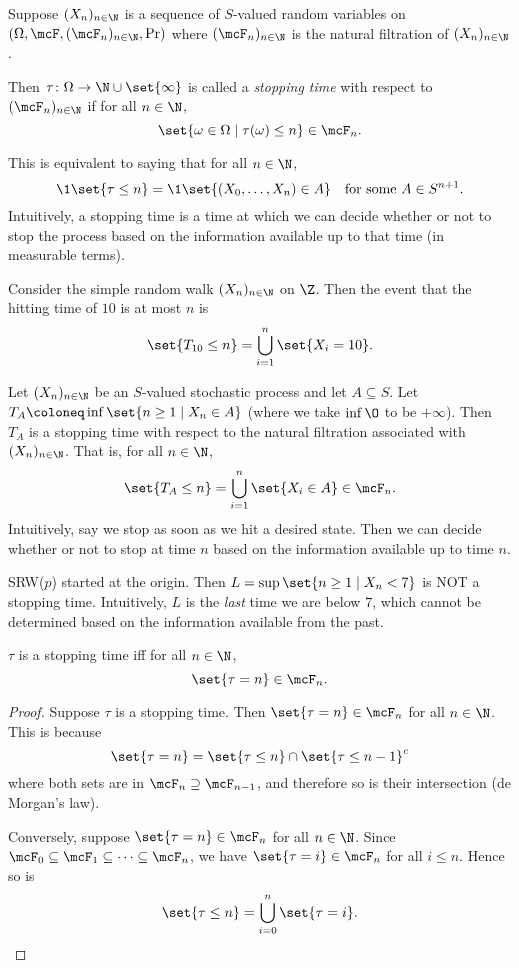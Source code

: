 \begin{definition} \label{def:stopping_time}
    Suppose $(X_n)_{n \in \N}$ is a sequence of $S$-valued random variables
    on $(\Omega, \F, (\F_n)_{n \in \N}, \Pr)$ where $(\F_n)_{n \in \N}$ is
    the natural filtration of $(X_n)_{n \in \N}$.

    Then $\tau\colon \Omega \to \N \cup \set{\infty}$ is called a
    \emph{stopping time} with respect to $(\F_n)_{n \in \N}$ if for all
    $n \in \N$, \[
        \set{\omega \in \Omega \mid \tau(\omega) \le n} \in \F_n.
    \]
\end{definition}
This is equivalent to saying that for all $n \in \N$, \[
    \1{\set{\tau \le n}} = \1{\set{(X_0, \dots, X_n) \in A}}
    \quad \text{for some } A \in S^{n+1}.
\]
Intuitively, a stopping time is a time at which we can decide whether or not
to stop the process based on the information available up to that time (in
measurable terms).

Consider the simple random walk $(X_n)_{n \in \N}$ on $\Z$.
Then the event that the hitting time of $10$ is at most $n$ is \[
    \set{T_{10} \le n} = \bigcup_{i=1}^{n} \set{X_i = 10}.
\]
\begin{examples}
    \item Let $(X_n)_{n \in \N}$ be an $S$-valued stochastic process and let
    $A \subseteq S$.
    Let $T_A \coloneq \inf\set{n \ge 1 \mid X_n \in A}$ (where we take
    $\inf \O$ to be $+\infty$).
    Then $T_A$ is a stopping time with respect to the natural filtration
    associated with $(X_n)_{n \in \N}$.
    That is, for all $n \in \N$, \[
        \set{T_A \le n} = \bigcup_{i=1}^{n} \set{X_i \in A} \in \F_n.
    \]
    Intuitively, say we stop as soon as we hit a desired state.
    Then we can decide whether or not to stop at time $n$ based on the
    information available up to time $n$.
    \item SRW($p$) started at the origin.
    Then $L = \sup \set{n \ge 1 \mid X_n < 7}$ is NOT a stopping time.
    Intuitively, $L$ is the \emph{last} time we are below $7$, which cannot
    be determined based on the information available from the past.
\end{examples}
\begin{proposition}
    $\tau$ is a stopping time iff for all $n \in \N$, \[
        \set{\tau = n} \in \F_n.
    \]
\end{proposition}
\begin{proof}
    Suppose $\tau$ is a stopping time.
    Then $\set{\tau = n} \in \F_n$ for all $n \in \N$.
    This is because \[
        \set{\tau = n} = \set{\tau \le n} \cap \set{\tau \le n-1}^c
    \] where both sets are in $\F_n \supseteq \F_{n-1}$,
    and therefore so is their intersection (de Morgan's law).

    Conversely, suppose $\set{\tau = n} \in \F_n$ for all $n \in \N$.
    Since $\F_0 \subseteq \F_1 \subseteq \dots \subseteq \F_n$, we have
    $\set{\tau = i} \in \F_n$ for all $i \le n$.
    Hence so is \[
        \set{\tau \le n} = \bigcup_{i=0}^{n} \set{\tau = i}. \qedhere
    \]
\end{proof}

